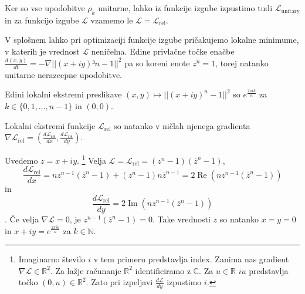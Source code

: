 \documentclass[mat2, tisk]{fmfdelo}
\newcommand{\TODO}[1]{{\color{blue} TODO: #1}}
\newcommand{\R}{\mathbb R}
\newcommand{\N}{\mathbb N}
\newcommand{\loss }{\mathcal L}
\newcommand{\Loss}[1]{\mathcal L _\text{#1}}
\newcommand{\C}{\mathbb C}
\begin{document}
      Ker so vse upodobitve $\rho_k$ unitarne, lahko iz funkcije
      izgube izpustimo tudi $\Loss{unitary}$ in za funkcijo izgube
      $\loss$ vzamemo le $\loss=\Loss{rel}$.

      V splošnem lahko pri optimizaciji funkcije izgube pričakujemo
      lokalne minimume, v katerih je vrednost $\loss$ neničelna.
      Edine privlačne točke enačbe $\frac{d(x,y)}{dt} = -\nabla ||(x
      + iy)³n -1||^2$ pa so koreni enote $z^n=1$, torej natanko
      unitarne nerazcepne upodobitve.
      \begin{izrek}
        \label{izrek:kritične točke ciklične}
        Edini lokalni ekstremi preslikave $(x,y) \mapsto ||(x + iy)^n
        -1||^2$ so $e^\frac{2 \pi i k}{n}$  za $k \in \{0,1, \dotsc,
        n-1\}$ in $(0,0)$.
      \end{izrek}
      \begin{dokaz}
        Lokalni ekstremi funkcije $\Loss{rel}$ so natanko v ničlah
        njenega gradienta $\nabla \Loss{rel} =
        (\frac{d\Loss{rel}}{dx}, \frac{d\Loss{rel}}{dy})$.

        Uvedemo $z = x + iy$.
        \footnote{Imaginarno število $i$ v tem primeru predstavlja index.
          Zanima nas gradient $\nabla \loss \in \R^2$. Za lažje
          računanje $\R^2$ identificiramo z $\C$.
          Za $u   \in \R$  $iu$ predstavlja točko $(0, u) \in \R^2$.
        Zato pri izpeljavi $\frac{d\loss}{dy}$ izpustimo $i$.}
        Velja $\loss = \Loss{rel} = (z^n-1)(\overline{z}^n-1)$,
        $$\frac{d\Loss{rel}}{dx} = nz^{n-1}(\overline{z}^n -1) + (z^n
        -1) n \overline{z}^{n-1} = 2 \operatorname{Re}(n
        z^{n-1}(\overline{z}^n -1))
        $$
        in
        $$\frac{d\Loss{rel}}{dy} =
        2\operatorname{Im}(n z^{n-1}(\overline{z}^n -1))
        $$.
        Če velja $\nabla \loss = 0$, je $z^{n-1}(\overline{z} ^n -1)
        = 0$. Take vrednosti $z$ so natanko $x=y=0$ in $x + iy =
        e^\frac{2 \pi i k}{n}$ za $k \in \N$.
      \end{dokaz}
\end{document}
